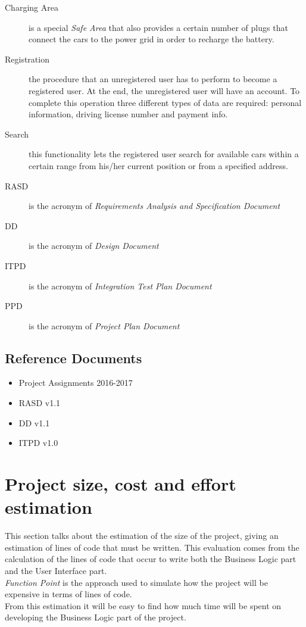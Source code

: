 \documentclass[11pt,a4paper]{report}
\begin{document}
\begin{description}
	\item[Charging Area] is a special \textit{Safe Area} that also provides a certain number of plugs that connect the cars to the power grid in order to recharge the battery.
	\item[Registration] the procedure that an unregistered user has to perform to become a registered user. At the end, the unregistered user will have an account. To complete this operation three different types of data are required: personal information, driving license number and payment info.
	\item[Search] this functionality lets the registered user search for available cars within a certain range from his/her current position or from a specified address.
	\item[RASD] is the acronym of \textit{Requirements Analysis and Specification Document}
	\item[DD] is the acronym of \textit{Design Document}
	\item[ITPD] is the acronym of \textit{Integration Test Plan Document}
	\item[PPD] is the acronym of \textit{Project Plan Document}
\end{description}
\section{Reference Documents}
	\begin{itemize}
	\item Project Assignments 2016-2017
	\item RASD v1.1
	\item DD v1.1
	\item ITPD v1.0
\end{itemize}
\chapter[Project size, cost and effort estimation]{Project size, cost and effort\\estimation}
This section talks about the estimation of the size of the project, giving an estimation of lines of code that must be written.
This evaluation comes from the calculation of the lines of code that occur to write both the Business Logic part and the User Interface part.\\
\textit{Function Point} is the approach used to simulate how the project will be expensive in terms of lines of code.\\
From this estimation it will be easy to find how much time will be spent on developing the Business Logic part of the project.
\end{document}
